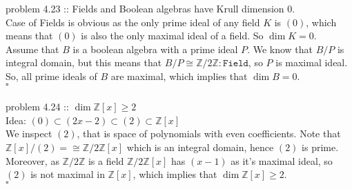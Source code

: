 \documentclass[12pt]{article}
\renewcommand{\.}{\; . \;}
\begin{document}
problem 4.23 :: Fields and Boolean algebras have Krull dimension $0$. \\
Case of Fields is obvious as the only prime ideal of any field $K$ is $(0)$, which means that $(0)$ is also the only maximal ideal of a field. So $\dim K = 0$. \\
Assume that $B$ is a boolean algebra with a prime ideal $P$. We know that $B / P$ is integral domain, but this means that $B / P \cong \mathbb{Z} / 2 \mathbb{Z} : \mathtt{Field}$, so $P$ is maximal ideal. So, all prime ideals of $B$ are maximal, which implies that  $\dim B = 0$. \\
$\square$ \\ \\ 
problem 4.24 :: $\dim \mathbb{Z}[x] \geq 2$ \\
Idea: $(0)  \subset (2x - 2) \subset (2) \subset  \mathbb{Z}[x] $ \\
We inspect $(2)$, that is space of polynomials with even coefficients. Note that 
$\mathbb{Z}[x] / (2) =\cong \mathbb{Z} / 2 \mathbb{Z} [x]$ which is an integral domain, hence $(2)$ is prime. \\ Moreover, as $\mathbb{Z} / 2 \mathbb{Z}$ is a field $\mathbb{Z} / 2 \mathbb{Z} [x]$ has $(x-1)$ as it's maximal ideal, so $(2)$ is not maximal in  $\mathbb{Z}[x] $, which implies that 
$\dim \mathbb{Z}[x] \geq  2$. \\
$\square$ \\
\end{document}
